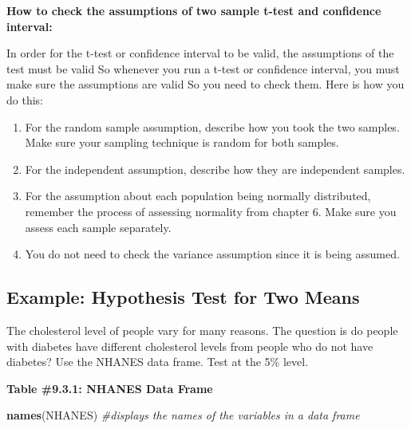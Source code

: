 \documentclass[
]{book}
\newenvironment{Shaded}{\begin{snugshade}}{\end{snugshade}}
\newcommand{\CommentTok}[1]{\textcolor[rgb]{0.56,0.35,0.01}{\textit{#1}}}
\newcommand{\KeywordTok}[1]{\textcolor[rgb]{0.13,0.29,0.53}{\textbf{#1}}}
\newcommand{\NormalTok}[1]{#1}
\begin{document}
\textbf{How to check the assumptions of two sample t-test and confidence interval:}

In order for the t-test or confidence interval to be valid, the assumptions of the test must be valid So whenever you run a t-test or confidence interval, you must make sure the assumptions are valid So you need to check them. Here is how you do this:

\begin{enumerate}
\def\labelenumi{\arabic{enumi}.}
\item
  For the random sample assumption, describe how you took the two samples. Make sure your sampling technique is random for both samples.
\item
  For the independent assumption, describe how they are independent samples.
\item
  For the assumption about each population being normally distributed, remember the process of assessing normality from chapter 6. Make sure you assess each sample separately.
\item
  You do not need to check the variance assumption since it is being assumed.
\end{enumerate}

\hypertarget{example-hypothesis-test-for-two-means}{%
\subsection{Example: Hypothesis Test for Two Means}\label{example-hypothesis-test-for-two-means}}

The cholesterol level of people vary for many reasons. The question is do people with diabetes have different cholesterol levels from people who do not have diabetes? Use the NHANES data frame. Test at the 5\% level.

\textbf{Table \#9.3.1: NHANES Data Frame}

\begin{Shaded}
\begin{Highlighting}[]
\KeywordTok{names}\NormalTok{(NHANES) }\CommentTok{#displays the names of the variables in a data frame}
\end{Highlighting}
\end{Shaded}
\end{document}
